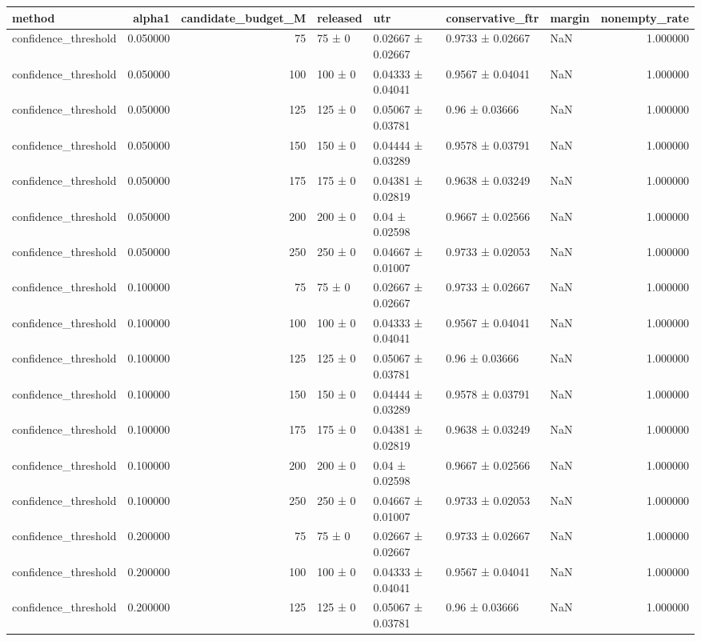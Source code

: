 \begin{tabular}{lrrllllr}
\toprule
method & alpha1 & candidate_budget_M & released & utr & conservative_ftr & margin & nonempty_rate \\
\midrule
confidence_threshold & 0.050000 & 75 & 75 ± 0 & 0.02667 ± 0.02667 & 0.9733 ± 0.02667 & NaN & 1.000000 \\
confidence_threshold & 0.050000 & 100 & 100 ± 0 & 0.04333 ± 0.04041 & 0.9567 ± 0.04041 & NaN & 1.000000 \\
confidence_threshold & 0.050000 & 125 & 125 ± 0 & 0.05067 ± 0.03781 & 0.96 ± 0.03666 & NaN & 1.000000 \\
confidence_threshold & 0.050000 & 150 & 150 ± 0 & 0.04444 ± 0.03289 & 0.9578 ± 0.03791 & NaN & 1.000000 \\
confidence_threshold & 0.050000 & 175 & 175 ± 0 & 0.04381 ± 0.02819 & 0.9638 ± 0.03249 & NaN & 1.000000 \\
confidence_threshold & 0.050000 & 200 & 200 ± 0 & 0.04 ± 0.02598 & 0.9667 ± 0.02566 & NaN & 1.000000 \\
confidence_threshold & 0.050000 & 250 & 250 ± 0 & 0.04667 ± 0.01007 & 0.9733 ± 0.02053 & NaN & 1.000000 \\
confidence_threshold & 0.100000 & 75 & 75 ± 0 & 0.02667 ± 0.02667 & 0.9733 ± 0.02667 & NaN & 1.000000 \\
confidence_threshold & 0.100000 & 100 & 100 ± 0 & 0.04333 ± 0.04041 & 0.9567 ± 0.04041 & NaN & 1.000000 \\
confidence_threshold & 0.100000 & 125 & 125 ± 0 & 0.05067 ± 0.03781 & 0.96 ± 0.03666 & NaN & 1.000000 \\
confidence_threshold & 0.100000 & 150 & 150 ± 0 & 0.04444 ± 0.03289 & 0.9578 ± 0.03791 & NaN & 1.000000 \\
confidence_threshold & 0.100000 & 175 & 175 ± 0 & 0.04381 ± 0.02819 & 0.9638 ± 0.03249 & NaN & 1.000000 \\
confidence_threshold & 0.100000 & 200 & 200 ± 0 & 0.04 ± 0.02598 & 0.9667 ± 0.02566 & NaN & 1.000000 \\
confidence_threshold & 0.100000 & 250 & 250 ± 0 & 0.04667 ± 0.01007 & 0.9733 ± 0.02053 & NaN & 1.000000 \\
confidence_threshold & 0.200000 & 75 & 75 ± 0 & 0.02667 ± 0.02667 & 0.9733 ± 0.02667 & NaN & 1.000000 \\
confidence_threshold & 0.200000 & 100 & 100 ± 0 & 0.04333 ± 0.04041 & 0.9567 ± 0.04041 & NaN & 1.000000 \\
confidence_threshold & 0.200000 & 125 & 125 ± 0 & 0.05067 ± 0.03781 & 0.96 ± 0.03666 & NaN & 1.000000 \\

\end{tabular}
